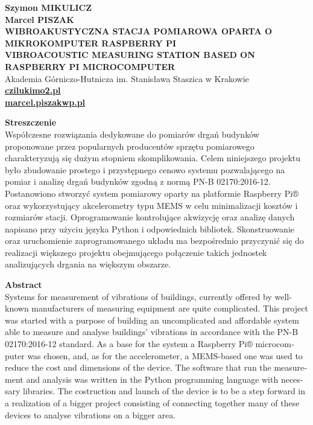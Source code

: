 \documentclass[a4paper,12pt]{mwart}
\begin{document}
\onehalfspacing
{\raggedright%
  \textbf{Szymon \MakeUppercase{Mikulicz}} \\
  \textbf{Marcel \MakeUppercase{Piszak}} \\
  \vspace*{5pt}%
  \MakeUppercase{\textbf{Wibroakustyczna stacja pomiarowa oparta o mikrokomputer Raspberry Pi}} \\
  \vspace*{5pt}%
  \MakeUppercase{\textbf{Vibroacoustic measuring station based on Raspberry Pi microcomputer}} \\
  \vspace*{5pt}%
  Akademia Górniczo-Hutnicza im. Stanisława Staszica w Krakowie\\
  \vspace*{5pt}%
  \href{mailto:czilukim@o2.pl}{\textsf{\textbf{czilukim\MVAt o2.pl}}}\\
  \href{mailto:marcel.piszak@wp.pl}{\textsf{\textbf{marcel.piszak\MVAt wp.pl}}}

  \vspace*{5pt}%
}%

\noindent\textbf{Streszczenie}\\
Współczesne rozwiązania dedykowane do pomiarów drgań budynków proponowane przez
popularnych producentów sprzętu pomiarowego charakteryzują się dużym stopniem
skomplikowania. Celem niniejszego projektu było zbudowanie prostego i
przystępnego cenowo systemu pozwalającego na pomiar i analizę drgań budynków
zgodną z normą PN-B 02170:2016-12. Postanowiono stworzyć system pomiarowy
oparty na platformie Raspberry Pi® oraz wykorzystujący akcelerometry typu MEMS
w celu minimalizacji kosztów i rozmiarów stacji. Oprogramowanie kontrolujące
akwizycję oraz analizę danych napisano przy użyciu języka Python i odpowiednich
bibliotek. Skonstruowanie oraz uruchomienie zaprogramowanego układu ma
bezpośrednio przyczynić się do realizacji większego projektu obejmującego
połączenie takich jednostek analizujących drgania na większym obszarze.
\vspace*{5pt}

\noindent
\begin{otherlanguage}{english}
\textbf{Abstract} \\
Systems for measurement of vibrations of buildings, currently offered by
well-known manufacturers of measuring equipment are quite complicated. This
project was started with a purpose of building an uncomplicated and affordable
system able to measure and analyse buildings' vibrations in accordance with the
PN-B 02170:2016-12 standard. As a base for the system a Raspberry Pi®
microcomputer was chosen, and, as for the accelerometer, a MEMS-based one was
used to reduce the cost and dimensions of the device. The software that run the
measurement and analysis was written in the Python programming language with
necessary libraries. The costruction and launch of the device is to be a step
forward in a realization of a bigger project consisting of connecting together
many of these devices to analyse vibrations on a bigger area.
\end{otherlanguage}
\vspace*{24pt}
\end{document}
